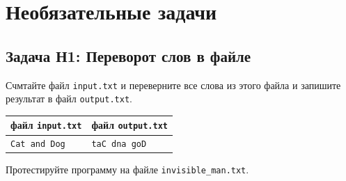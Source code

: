\documentclass{article}
\begin{document}
\newpage
\section*{Необязательные задачи}
\subsection*{Задача Н1: Переворот слов в файле}
Счмтайте файл \texttt{input.txt}  и переверните все слова из этого файла и запишите результат в файл \texttt{output.txt}.
\begin{center} 
\begin{tabular}{ l | l }
 файл \texttt{input.txt} & файл \texttt{output.txt} \\ \hline
 \texttt{Cat and Dog} & \texttt{taC dna goD}\\
\end{tabular}
\end{center}
Протестируйте программу на файле \texttt{invisible\_man.txt}.
\end{document}
